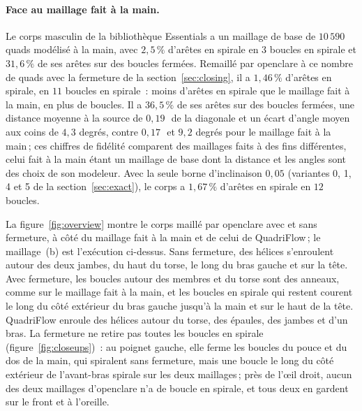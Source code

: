 \documentclass[11pt,a4paper]{article}
\begin{document}
\paragraph{Face au maillage fait à la main.}
Le corps masculin de la bibliothèque Essentials a un maillage de base de
$10\,590$ quads modélisé à la main, avec $2,5\,\%$ d'arêtes en spirale en
$3$ boucles en spirale et $31,6\,\%$ de ses arêtes sur des boucles fermées.
Remaillé par openclare à ce nombre de quads avec la fermeture de la
section~\ref{sec:closing}, il a $1,46\,\%$ d'arêtes en spirale, en $11$
boucles en spirale~: moins d'arêtes en spirale que le maillage fait à la
main, en plus de boucles. Il a $36,5\,\%$ de ses arêtes sur des boucles
fermées, une distance moyenne à la source de $0,19$\,\textperthousand\ de la
diagonale et un écart d'angle moyen aux coins de $4,3$ degrés, contre $0,17$\,\textperthousand\ et $9,2$ degrés pour le
maillage fait à la main\,; ces chiffres de fidélité comparent des maillages
faits à des fins différentes, celui fait à la main étant un maillage de base
dont la distance et les angles sont des choix de son modeleur. Avec la
seule borne d'inclinaison $0,05$ (variantes 0, 1, 4 et 5 de la
section~\ref{sec:exact}), le corps a $1,67\,\%$ d'arêtes en spirale en $12$
boucles.

La figure~\ref{fig:overview} montre le corps maillé par openclare avec et
sans fermeture, à côté du maillage fait à la main et de celui de
QuadriFlow\,; le maillage~(b) est l'exécution ci-dessus. Sans fermeture, des
hélices s'enroulent autour des deux jambes, du haut du torse, le long du
bras gauche et sur la tête. Avec fermeture, les boucles autour des membres
et du torse sont des anneaux, comme sur le maillage fait à la main, et les
boucles en spirale qui restent courent le long du côté extérieur du bras
gauche jusqu'à la main et sur le haut de la tête. QuadriFlow enroule des
hélices autour du torse, des épaules, des jambes et d'un bras. La fermeture
ne retire pas toutes les boucles en spirale (figure~\ref{fig:closeups})~: au
poignet gauche, elle ferme les boucles du pouce et du dos de la main, qui
spiralent sans fermeture, mais une boucle le long du côté extérieur de
l'avant-bras spirale sur les deux maillages\,; près de l'œil droit, aucun
des deux maillages d'openclare n'a de boucle en spirale, et tous deux en
gardent sur le front et à l'oreille.
\end{document}
